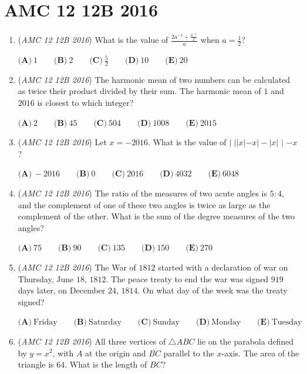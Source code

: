 \section{AMC 12 12B 2016}
        \begin{enumerate}
        	\item (\textit{AMC 12 12B 2016}) What is the value of $\frac{2a^{-1}+\frac{a^{-1}}{2}}{a}$ when $a= \frac{1}{2}$?


 $\textbf{(A)}\ 1\qquad\textbf{(B)}\ 2\qquad\textbf{(C)}\ \frac{5}{2}\qquad\textbf{(D)}\ 10\qquad\textbf{(E)}\ 20$


	\item (\textit{AMC 12 12B 2016}) The harmonic mean of two numbers can be calculated as twice their product divided by their sum. The harmonic mean of $1$ and $2016$ is closest to which integer?


 $\textbf{(A)}\ 2 \qquad \textbf{(B)}\ 45 \qquad \textbf{(C)}\ 504 \qquad \textbf{(D)}\ 1008 \qquad \textbf{(E)}\ 2015$


	\item (\textit{AMC 12 12B 2016}) Let $x=-2016$. What is the value of $\bigg|$ $||x|-x|-|x|$ $\bigg|$ $-x$?


 $\textbf{(A)}\ -2016\qquad\textbf{(B)}\ 0\qquad\textbf{(C)}\ 2016\qquad\textbf{(D)}\ 4032\qquad\textbf{(E)}\ 6048$


	\item (\textit{AMC 12 12B 2016}) The ratio of the measures of two acute angles is $5:4$, and the complement of one of these two angles is twice as large as the complement of the other. What is the sum of the degree measures of the two angles?


 $\textbf{(A)}\ 75\qquad\textbf{(B)}\ 90\qquad\textbf{(C)}\ 135\qquad\textbf{(D)}\ 150\qquad\textbf{(E)}\ 270$


	\item (\textit{AMC 12 12B 2016}) The War of $1812$ started with a declaration of war on Thursday, June $18$, $1812$. The peace treaty to end the war was signed $919$ days later, on December $24$, $1814$. On what day of the week was the treaty signed? 


 $\textbf{(A)}\ \text{Friday} \qquad \textbf{(B)}\ \text{Saturday} \qquad \textbf{(C)}\ \text{Sunday} \qquad \textbf{(D)}\ \text{Monday} \qquad \textbf{(E)}\ \text{Tuesday}$


	\item (\textit{AMC 12 12B 2016}) All three vertices of $\bigtriangleup ABC$ lie on the parabola defined by $y=x^2$, with $A$ at the origin and $\overline{BC}$ parallel to the $x$-axis. The area of the triangle is $64$. What is the length of $BC$?  



\end{enumerate}
